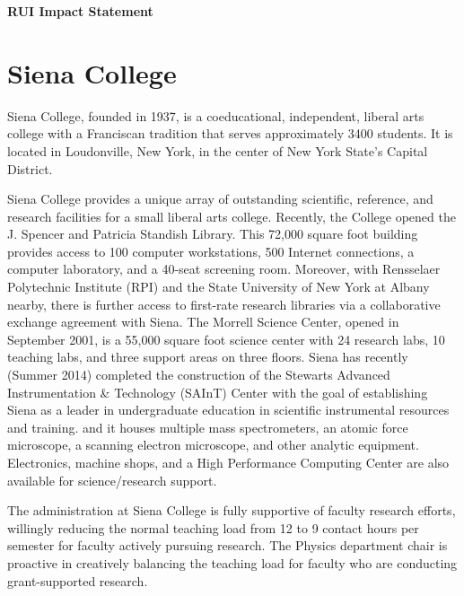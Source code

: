 \documentclass[11pt]{article}
\begin{document}
\centerline{\Large\bf RUI Impact Statement}
\vspace{0.2cm}

\section{Siena College}
Siena College, founded in 1937, is a coeducational, independent, liberal arts college 
with a Franciscan tradition that serves approximately 3400 students. It is located in Loudonville, New York,
in the center of New York State's Capital District.

Siena College provides a unique array of outstanding scientific, reference, and research facilities
for a small liberal arts college. Recently, the College opened the J. Spencer and Patricia Standish
Library. This 72,000 square foot building provides access to 100 computer workstations, 
500 Internet connections, a computer laboratory, and a 40-seat screening room. Moreover, with Rensselaer
Polytechnic Institute (RPI) and the State University of New York at Albany nearby, there is further
access to first-rate research libraries via a collaborative exchange agreement with Siena. The
Morrell Science Center, opened in September 2001, is a 55,000 square foot science center with 24
research labs, 10 teaching labs, and three support areas on three floors. 
Siena has recently (Summer 2014) completed the construction of the
Stewarts Advanced Instrumentation \& Technology (SAInT) Center with the goal of
establishing Siena as a leader in undergraduate education in scientific
instrumental resources and training. 
and it houses multiple mass spectrometers,
an atomic force microscope, a scanning electron microscope, and other
analytic equipment.  Electronics, machine shops, and a
High Performance Computing Center are also available for science/research support.

The administration at Siena College is fully supportive of faculty research efforts, willingly reducing
the normal teaching load from 12 to 9 contact hours per semester for faculty actively pursuing
research. The Physics department chair is proactive in creatively balancing the
teaching load for faculty who are conducting grant-supported research.
\end{document}
